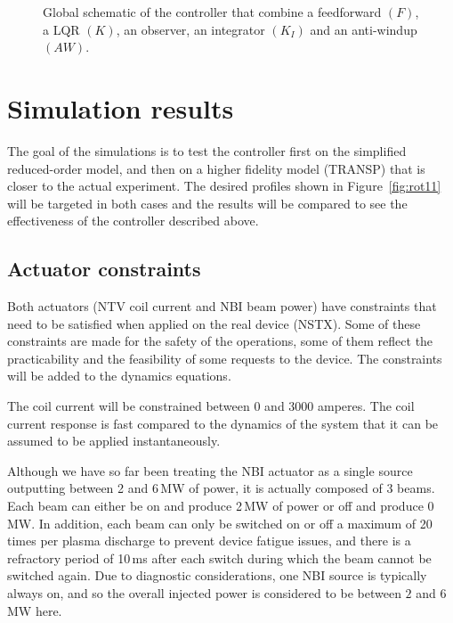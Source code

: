\documentclass[12pt,lot, lof]{puthesis}
\begin{document}
\begin{figure}

\caption{Global schematic of the controller that combine a feedforward $(F)$, a LQR $(K)$, an observer, an integrator $(K_I)$ and an anti-windup $(AW)$.}
\label{fig:model1}
\end{figure}



\section{Simulation results} 
\label{sec:sim_results}
The goal of the simulations is to test the controller first on the simplified reduced-order model, and then on a higher fidelity model (TRANSP) that is closer to the actual experiment.  The desired profiles shown in Figure~\ref{fig:rot11} will be targeted in both cases and the results will be compared to see the effectiveness of the controller described above.

\subsection{Actuator constraints}
\label{constraints}

Both actuators (NTV coil current and NBI beam power) have constraints that need to be satisfied when applied on the real device (NSTX). Some of these constraints are made for the safety of the operations, some of them reflect the practicability and the feasibility of some requests to the device. The constraints will be added to the dynamics equations.

The coil current will be constrained between 0 and 3000 amperes.
The coil current response is fast compared to the dynamics of the system that it can be assumed to be applied instantaneously.

Although we have so far been treating the NBI actuator as a single source outputting between 2 and 6\,MW of power, it is actually composed of 3 beams. Each beam can either be on and produce 2\,MW of power or off and produce 0\,MW.
In addition, each beam can only be switched on or off a maximum of 20 times per plasma discharge to prevent device fatigue issues, and there is a refractory period of 10\,ms after each switch during which the beam cannot be switched again.
Due to diagnostic considerations, one NBI source is typically always on, and so the overall injected power is considered to be between $2$ and $6$ MW here.
\end{document}
